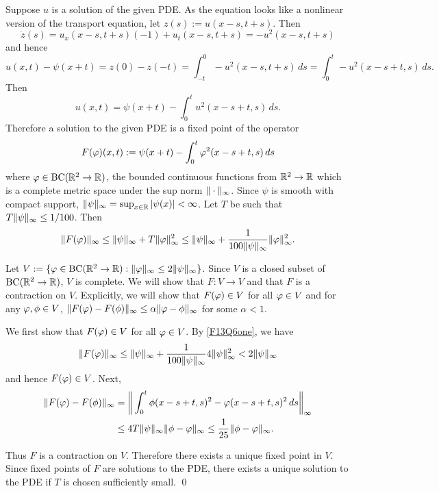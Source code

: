 Suppose $u$ is a solution of the given PDE. As the equation looks like a nonlinear version
of the transport equation, let $z(s) := u(x - s, t + s)$. Then
$$\dot{z}(s) = u_{x}(x - s, t + s)(-1) + u_{t}(x - s, t + s) = -u^{2}(x - s, t + s)$$
and hence
$$u(x, t) - \psi(x + t) = z(0) - z(-t) = \int_{-t}^{0}-u^{2}(x - s, t + s)\, ds = \int_{0}^{t}-u^{2}(x - s + t, s)\, ds.$$
Then
$$u(x, t) = \psi(x + t) - \int_{0}^{t}u^{2}(x - s + t, s)\, ds.$$
Therefore a solution to the given PDE is a fixed point of the operator
$$F(\varphi)(x, t) := \psi(x + t) - \int_{0}^{t}\varphi^{2}(x - s + t, s)\, ds$$
where $\varphi \in \textrm{BC}(\mathbb{R}^{2} \rightarrow \mathbb{R})$, the bounded continuous functions from $\mathbb{R}^{2} \rightarrow \mathbb{R}$
which is a complete metric space under the sup norm $\| \cdot \|_{\infty}$.
Since $\psi$ is smooth with compact support, $\| \psi \|_{\infty} = \sup_{x \in \mathbb{R}}|\psi(x)| < \infty$.
Let $T$ be such that $T\| \psi \|_{\infty} \leq 1/100$. Then
\begin{align}
\label{F13Q6one}
\| F(\varphi) \|_{\infty} \leq \| \psi \|_{\infty} + T\| \varphi \|_{\infty}^{2} \leq \| \psi \|_{\infty} + \frac{1}{100\| \psi \|_{\infty}}\| \varphi \|_{\infty}^{2}.
\end{align}

Let $V := \{\varphi \in \textrm{BC}(\mathbb{R}^{2} \rightarrow \mathbb{R}): \|\varphi\|_{\infty} \leq 2\|\psi\|_{\infty}\}$.
Since $V$ is a closed subset of $\textrm{BC}(\mathbb{R}^{2} \rightarrow \mathbb{R})$, $V$ is complete.
We will show that
$F: V \rightarrow V$ and that $F$ is a contraction on $V$. Explicitly, we will show that $F(\varphi) \in V$ for all $\varphi \in V$
and for any $\varphi, \phi \in V$, $\|F(\varphi) - F(\phi)\|_{\infty} \leq \alpha \|\varphi - \phi\|_{\infty}$ for some $\alpha < 1$.

We first show that $F(\varphi) \in V$ for all $\varphi \in V$. By \eqref{F13Q6one}, we have
\begin{align*}
\|F(\varphi)\|_{\infty} \leq \|\psi\|_{\infty} + \frac{1}{100\| \psi \|_{\infty}}4\|\psi\|_{\infty}^{2} < 2\|\psi\|_{\infty}
\end{align*}
and hence $F(\varphi) \in V$. Next,
\begin{align*}
\|F(\varphi) - F(\phi)\|_{\infty} &= \bigg\|\int_{0}^{t}\phi(x - s + t, s)^{2} - \varphi(x - s + t, s)^{2}\, ds\bigg\|_{\infty}\\
&\leq 4T\|\psi\|_{\infty}\|\phi - \varphi\|_{\infty} \leq \frac{1}{25}\|\phi - \varphi\|_{\infty}.
\end{align*}

Thus $F$ is a contraction on $V$. Therefore there exists a unique fixed point in $V$. Since fixed points of
$F$ are solutions to the PDE, there exists a unique solution to the PDE if $T$ is chosen sufficiently small. \hfill\qed


